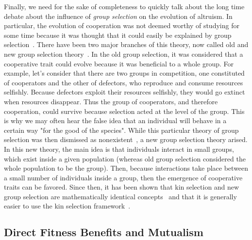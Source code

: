     Finally, we need for the sake of completeness to quickly talk about the long time debate about the influence of \emph{group selection} on the evolution of altruism. In particular, the evolution of cooperation was not deemed worthy of studying for some time because it was thought that it could easily be explained by group selection~\parencite{Axelrod1981}. There have been two major branches of this theory, now called old and new group selection theory~\parencite{West2007a}. In the old group selection, it was considered that a cooperative trait could evolve because it was beneficial to a whole group. For example, let's consider that there are two groups in competition, one constituted of cooperators and the other of defectors, who reproduce and consume resources selfishly. Because defectors exploit their resources selfishly, they would go extinct when resources disappear. Thus the group of cooperators, and therefore cooperation, could survive because selection acted at the level of the group. This is why we may often hear the false idea that an individual will behave in a certain way "for the good of the species". While this particular theory of group selection was then dismissed as nonexistent~\parencite{MaynardSmith1976}, a new group selection theory arised. In this new theory, the main idea is that individuals interact in small groups, which exist inside a given population (whereas old group selection considered the whole population to be the group). Then, because interactions take place between a small number of individuals inside a group, then the emergence of cooperative traits can be favored. Since then, it has been shown that kin selection and new group selection are mathematically identical concepts~\parencite{Hamilton1975, VanBaalen1998, Gardner2007} and that it is generally easier to use the kin selection framework~\parencite{West2007a}.


  \subsection{Direct Fitness Benefits and Mutualism}

